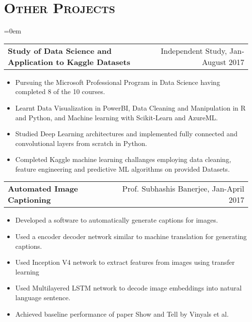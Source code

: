 \documentclass{article}
\makeatletter
\newenvironment{longversion}{}{} %
\newcommand{\headerrow}[2]
{\begin{tabular*}{\linewidth}{l@{\extracolsep{\fill}}r}
    #1 &
    #2 \\
\end{tabular*}}
\newcommand{\tmpsection}[1]{}
\let\tmpsection=\section
\renewcommand{\section}[1]{\tmpsection*{\textsc{#1}}}
\makeatother
\begin{document}
\begin{longversion}
\section{Other Projects}
\begin{list} {}{\leftmargin=0em}
\setlength{\leftmargin}{0pt}


\item[]
\headerrow {\textbf{Study of Data Science and Application to Kaggle Datasets}}{Independent Study, Jan-August 2017}
\begin{itemize}
\setlength\itemsep{0.0em}
    \item Pursuing the Microsoft Professional Program in Data Science having completed 8 of the 10 courses.
    \item Learnt Data Visualization in PowerBI, Data Cleaning and Manipulation in R and Python, and Machine learning with Scikit-Learn and AzureML.
    \item Studied Deep Learning architectures and implemented fully connected and convolutional layers from scratch in Python. 
    \item Completed Kaggle machine learning challanges employing data cleaning, feature engineering and predictive ML algorithms on provided Datasets.
\end{itemize}


\item[]
\headerrow {\textbf{Automated Image Captioning}}{Prof. Subhashis Banerjee, Jan-April 2017}
\begin{itemize}
\setlength\itemsep{0.0em}
    \item Developed a software to automatically generate captions for images.
    \item Used a encoder decoder network similar to machine translation for generating captions.
    \item Used Inception V4 network to extract features from images using transfer learning
    \item Used Multilayered LSTM network to decode image embeddings into natural language sentence.
    \item Achieved baseline performance of paper Show and Tell by Vinyals et al.
\end{itemize}



\end{list}
\end{longversion}
\end{document}
